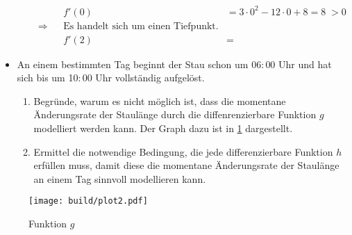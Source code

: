 \begin{itemize}
\begin{enumerate}
\begin{align*}
                 && f'(0) &= 3\cdot 0^2 - 12\cdot 0 +8 = 8\;>0\\
                 \Rightarrow && \text{Es handelt sich um einen Tiefpunkt.}\\
                 && f'(2) &=
             \end{align*}
         \end{enumerate}
     \item An einem bestimmten Tag beginnt der Stau schon um 06$:$00 Uhr und hat sich bis um 10$:$00 Uhr vollständig aufgelöst.
         \begin{enumerate}
             \item Begründe, warum es nicht möglich ist, dass die momentane Änderungsrate der Staulänge durch die diffenrenzierbare Funktion $g$ modelliert werden kann.
                 Der Graph dazu ist in \ref{fig:g} dargestellt.
            \item Ermittel die notwendige Bedingung, die jede differenzierbare Funktion $h$ erfüllen muss, damit diese die momentane Änderungsrate der Staulänge an einem Tag sinnvoll modellieren kann.
        \end{enumerate}
\end{itemize}
\begin{figure}
    \centering
    \texttt{[image: build/plot2.pdf]}
    \caption{Funktion $g$}
    \label{fig:g}
\end{figure}


